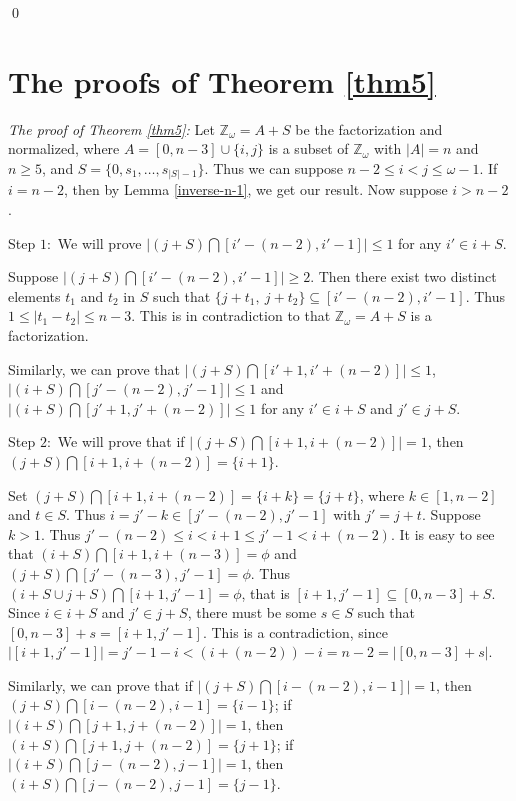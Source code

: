 \documentclass[preprint]{elsarticle}
\begin{document}
\qed












\section{The proofs of Theorem \ref{thm5}}



\textit{The proof of Theorem \ref{thm5}:}
Let $\mathbb{Z}_{\omega}=A+S$ be the factorization and normalized,
where $A=[0,n-3]\cup\{i,j\}$ is a subset of $\mathbb{Z}_{\omega}$ with $|A|=n$ and $n\geq 5$,
and $S=\{0,s_1,\ldots ,s_{|S|-1}\}$.
Thus we can suppose $n-2\leq i<j\leq \omega-1$.
If $i=n-2$, then by Lemma \ref{inverse-n-1}, we get our result.
Now suppose $i>n-2$.

Step $1:$ We will prove $|(j+S)\bigcap [i'-(n-2),i'-1]|\leq 1$ for any $i'\in i+S$.

Suppose $|(j+S)\bigcap [i'-(n-2),i'-1]|\geq 2$.
Then there exist two distinct elements $t_1$ and $t_2$ in $S$ such that $\{j+t_1,\ j+t_2\}\subseteq [i'-(n-2),i'-1]$.
Thus $1\leq |t_1-t_2|\leq n-3$. This is in contradiction to that $\mathbb{Z}_{\omega}=A+S$ is a factorization.

Similarly, we can prove that $|(j+S)\bigcap [i'+1,i'+(n-2)]|\leq 1$, $|(i+S)\bigcap [j'-(n-2),j'-1]|\leq 1$
and $|(i+S)\bigcap [j'+1,j'+(n-2)]|\leq 1$ for any $i'\in i+S$ and $j'\in j+S$.

Step $2:$ We will prove that if $|(j+S)\bigcap [i+1,i+(n-2)]|=1$,
then $(j+S)\bigcap [i+1,i+(n-2)]=\{i+1\}$.

Set $(j+S)\bigcap [i+1,i+(n-2)]=\{i+k\}=\{j+t\}$,
where $k\in [1,n-2]$ and $t\in S$.
Thus $i=j'-k\in [j'-(n-2),j'-1]$ with $j'=j+t$.
Suppose $k>1$.
Thus $j'-(n-2)\leq i<i+1\leq j'-1<i+(n-2).$
It is easy to see that $(i+S)\bigcap[i+1,i+(n-3)]=\phi$ and $(j+S)\bigcap[j'-(n-3),j'-1]=\phi$.
Thus $(i+S\cup j+S)\bigcap [i+1,j'-1]=\phi$, that is $[i+1,j'-1]\subseteq [0,n-3]+S$.
Since $i\in i+S$ and $j'\in j+S$,
there must be some $s\in S$ such that $[0,n-3]+s=[i+1,j'-1]$.
This is a contradiction, since $|[i+1,j'-1]|=j'-1-i<(i+(n-2))-i=n-2=|[0,n-3]+s|$.

Similarly, we can prove that if $|(j+S)\bigcap [i-(n-2),i-1]|=1$,
then $(j+S)\bigcap [i-(n-2),i-1]=\{i-1\}$;
if $|(i+S)\bigcap [j+1,j+(n-2)]|=1$,
then $(i+S)\bigcap [j+1,j+(n-2)]=\{j+1\}$;
if $|(i+S)\bigcap [j-(n-2),j-1]|=1$,
then $(i+S)\bigcap [j-(n-2),j-1]=\{j-1\}$.
\end{document}
